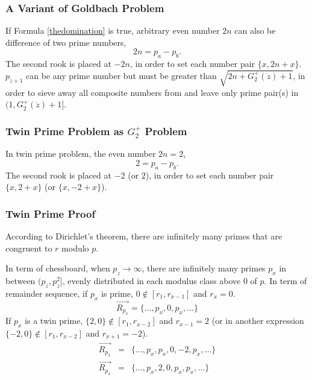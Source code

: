 \documentclass[twocolumn]{article}%
\theoremstyle{definition}
\theoremstyle{remark}
\begin{document}
\subsubsection*{A Variant of Goldbach Problem}
If Formula \eqref{thedomination} is true, arbitrary even number $2n$ can also be difference of two prime numbers,
\begin{equation*}
2n = p_a - p_b.
\end{equation*}
The second rook is placed at $-2n$, in order to set each number pair $\{x,2n+x\}$. $p_{\dot{z}+1}$ can be any prime number but must be greater than $\sqrt{2n + G_2^{+}(\dot{z})+1}$, in order to sieve away all composite numbers from and leave only prime pair(s) in $(1,G_2^{+}(\dot{z})+1]$.


\subsubsection*{Twin Prime Problem as $G_2^{+}$ Problem}

In twin prime problem, the even number $2n=2$,
\begin{equation*}
2 = p_a - p_b.
\end{equation*}
The second rook is placed at $-2$ (or $2$), in order to set each number pair $\{x,2+x\}$ (or $\{x,-2+x\}$).
 
\subsubsection*{Twin Prime Proof}
According to Dirichlet's theorem, there are infinitely many primes that are congruent to $r$ modulo $p$. 

In term of chessboard, when $p_{\dot{z}}\rightarrow\infty$, there are infinitely many primes $p_x$ in between $(p_{\dot{z}},p_{\dot{z}}^2]$, evenly distributed in each modulus class above 0 of $p$.
In term of remainder sequence, if $p_x$ is prime, $0\notin[r_{1},r_{x-1}]$ and $r_{x}=0$. 
\begin{equation*}
\overrightarrow{R_{p_x}}=\{\dots,p_x,0,p_x,\dots\}
\end{equation*}
If $p_x$ is a twin prime, $\{2,0\}\notin[r_{1},r_{x-2}]$ and $r_{x-1}=2$ (or in another expression $\{-2,0\}\notin[r_{1},r_{x-2}]$ and $r_{x+1}=-2$). 
\begin{eqnarray*}
	\overrightarrow{R_{p_x}}&=&\{\dots,p_x,p_x,0,-2,p_x,\dots\}\\
	\overrightarrow{R_{p_x}}&=&\{\dots,p_x,2,0,p_x,p_x,\dots\}
\end{eqnarray*}
\end{document}
